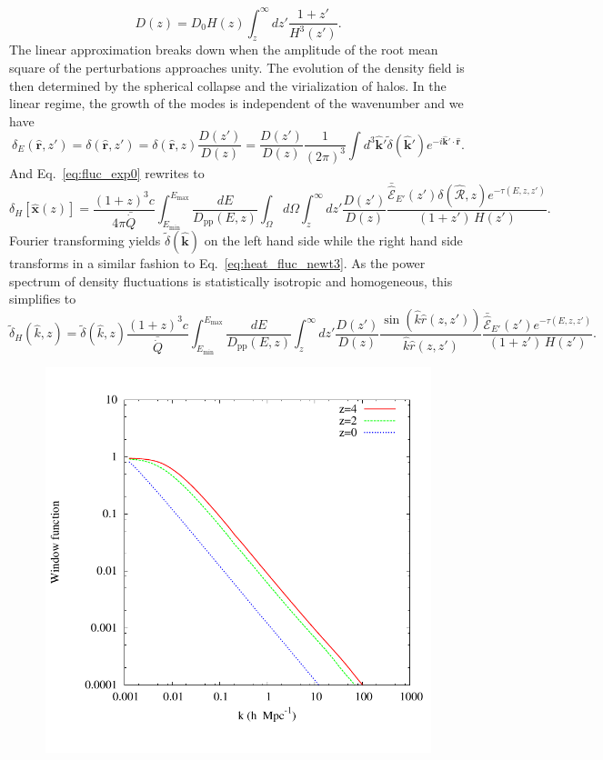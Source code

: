 \documentclass[numberedappendix]{emulateapj}
\begin{document}
{\begin{equation}
\label{eq:growth_1}
D(z)=D_0H(z)\int_z^{\infty}dz'\frac{1+z'}{H^3(z')}.
\end{equation}
The linear approximation breaks down when the amplitude of the root mean square of the perturbations approaches unity. The evolution of the density field is then determined by the spherical collapse \citep{1972ApJ...176....1G} and the virialization of halos. In the linear regime, the growth of the modes is independent of the wavenumber and we have
\begin{equation}
\label{eq:FT_delta}
\delta_E(\mathbf{\hat{r}}, z')=\delta(\mathbf{\hat{r}}, z')
=\delta(\mathbf{\hat{r}}, z)\frac{D(z')}{D(z)}
=\frac{D(z')}{D(z)}\frac{1}{(2\pi)^3}\int d^3\mathbf{\hat k'} \tilde{\delta}(\mathbf{\hat k'}) e^{-i\mathbf{\hat k'}\cdot\mathbf{\hat r}}.
\end{equation}
And Eq.~\eqref{eq:fluc_exp0} rewrites to
\begin{equation}
\label{eq:heat_fluc_exp0}
\delta_H[\mathbf{\hat{x}}(z)]=\frac{(1+z)^3  c}{4\pi\bar{\dot{Q}}}\int_{E_{\mathrm{min}}}^{E_{\mathrm{max}}} \frac{dE}{D_{\mathrm{pp}}(E,z)} \int_{\Omega}d\Omega\int_z^{\infty}dz' \frac{D(z')}{D(z)} \frac{\bar{\hat{\mathcal{E}}}_{E'}(z')\delta(\mathbf{\hat{\mathcal{R}}}, z) e^{-\tau(E,z,z')}}{(1+z')\,H(z')}.
\end{equation}
Fourier transforming yields $\tilde{\delta}(\mathbf{\hat k})$ on the left hand side while the right hand side transforms in a similar fashion to Eq.~\eqref{eq:heat_fluc_newt3}. As the power spectrum of density fluctuations is statistically isotropic and homogeneous, this simplifies to
\begin{equation}
\label{eq:heat_fluc_exp1}
\tilde{\delta}_H(\hat k, z)=\tilde{\delta}(\hat k, z) \frac{(1+z)^3c}{\bar{\dot{Q}}} \int_{E_{\mathrm{min}}}^{E_{\mathrm{max}}} \frac{dE}{D_{\mathrm{pp}}(E,z)}\int_z^{\infty} dz' \frac{D(z')}{D(z)}\frac{\sin\left(\hat k\hat r(z,z')\right)}{\hat k \hat r(z, z')} \frac{\bar{\hat{\mathcal{E}}}_{E'}(z') e^{-\tau(E,z,z')}} {(1+z')\,H(z')}.
\end{equation}
\begin{figure}[h]
\centering
\includegraphics[width = .45\textwidth ]{window_nobiases-eps-converted-to}

\end{figure}}
\end{document}
